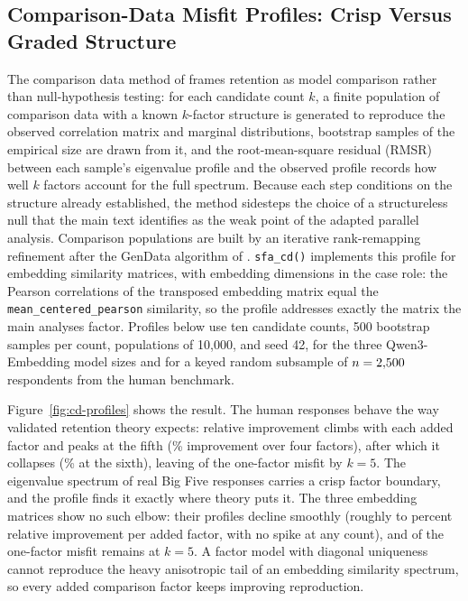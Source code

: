 \subsection{Comparison-Data Misfit Profiles: Crisp Versus Graded Structure}

The comparison data method of \citet{ruscio-roche-2012} frames retention
as model comparison rather than null-hypothesis testing: for each
candidate count $k$, a finite population of comparison data with a known
$k$-factor structure is generated to reproduce the observed correlation
matrix and marginal distributions, bootstrap samples of the empirical
size are drawn from it, and the root-mean-square residual (RMSR) between
each sample's eigenvalue profile and the observed profile records how
well $k$ factors account for the full spectrum. Because each step
conditions on the structure already established, the method sidesteps
the choice of a structureless null that the main text identifies as the
weak point of the adapted parallel analysis. Comparison populations are
built by an iterative rank-remapping refinement after the GenData
algorithm of \citet{ruscio-kaczetow-2008}. \texttt{sfa\_cd()}
implements this profile for embedding similarity matrices, with
embedding dimensions in the case role: the Pearson correlations of the
transposed embedding matrix equal the \texttt{mean\_centered\_pearson}
similarity, so the profile addresses exactly the matrix the main
analyses factor. Profiles below use ten candidate counts, 500
bootstrap samples per count, populations of 10{,}000, and seed 42, for the three Qwen3-Embedding model sizes and
for a keyed random subsample of $n = 2{,}500$ respondents from the
human benchmark.

Figure~\ref{fig:cd-profiles} shows the result. The human responses
behave the way validated retention theory expects: relative improvement
climbs with each added factor and peaks at the fifth
(\valCdHumanImpFive\% improvement over four factors), after which it
collapses (\valCdHumanImpSix\% at the sixth), leaving
\valCdHumanNormFive{} of the one-factor misfit by $k = 5$. The
eigenvalue spectrum of real Big Five responses carries a crisp factor
boundary, and the profile finds it exactly where theory puts it. The
three embedding matrices show no such elbow: their profiles decline
smoothly (roughly \valCdEmbImpLow{} to \valCdEmbImpHigh{} percent relative
improvement per added factor, with no spike at any count), and
\valCdEmbNormFiveRange{} of the one-factor misfit remains at $k = 5$.
A factor model with diagonal uniqueness cannot reproduce the heavy
anisotropic tail of an embedding similarity spectrum, so every added
comparison factor keeps improving reproduction.

